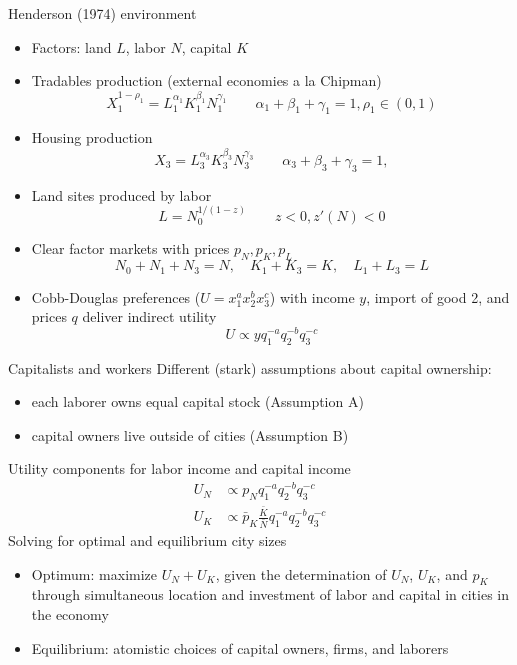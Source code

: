 \documentclass[11pt,notes=hide,aspectratio=169]{beamer}
\begin{document}
\begin{frame}{Henderson (1974) environment}
\begin{itemize}
\item Factors: land $L$, labor $N$, capital $K$
\item Tradables production (external economies a la Chipman)
\begin{equation*}
    X_1^{1-\rho_1} = L_{1}^{\alpha_1} K_{1}^{\beta_1} N_{1}^{\gamma_1}
    \qquad
    \alpha_1 + \beta_1 + \gamma_1 = 1,
    \rho_1\in(0,1)
\end{equation*}
\item Housing production
\begin{equation*}
    X_3 = L_{3}^{\alpha_3} K_{3}^{\beta_3} N_{3}^{\gamma_3}
    \qquad
    \alpha_3 + \beta_3 + \gamma_3 = 1,
\end{equation*}
\item Land sites produced by labor
\begin{equation*}
    L =  N_0^{1/(1-z)}
    \qquad
    z < 0, z'(N)<0
\end{equation*}
\item Clear factor markets with prices $p_N, p_K, p_L$
\begin{equation*}
    N_0 + N_1 + N_3  = N , \quad
    K_1 + K_3  = K , \quad
    L_1 + L_3  = L 
\end{equation*}
\item Cobb-Douglas preferences ($U=x_1^a x_2^b x_3^c$) with income $y$, import of good 2, and prices $q$ deliver indirect utility
\begin{equation*}
    U \propto y q_1^{-a} q_2^{-b} q_3^{-c}
\end{equation*}
\end{itemize}
\end{frame}
\begin{frame}{Capitalists and workers}
Different (stark) assumptions about capital ownership: 
\begin{itemize}
\item each laborer owns equal capital stock (Assumption A)
\item capital owners live outside of cities (Assumption B)
\end{itemize}
Utility components for labor income and capital income
\begin{align*}
U_N &
\propto p_N q_1^{-a} q_2^{-b} q_3^{-c}
\\
U_K &
\propto \bar{p}_K \frac{\bar{K}}{\bar{N}} q_1^{-a} q_2^{-b} q_3^{-c}
\end{align*}
Solving for optimal and equilibrium city sizes
\begin{itemize}
    \item Optimum: maximize $U_N + U_K$, given the determination of $U_N$, $U_K$, and $p_K$ through simultaneous location and investment of labor and capital in cities in the economy 
    \item Equilibrium: atomistic choices of capital owners, firms, and laborers
\end{itemize}
\end{frame}
\end{document}
